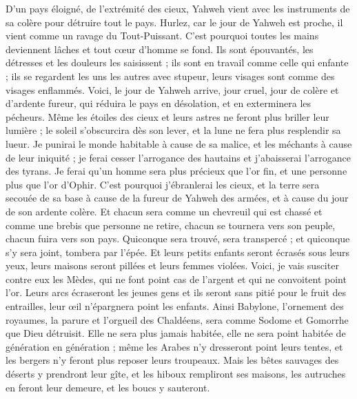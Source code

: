\begin{multicols}{2}
D'un pays éloigné, de l'extrémité des cieux, Yahweh vient avec les instruments de sa colère pour détruire tout le pays.
Hurlez, car le jour de Yahweh est proche, il vient comme un ravage du Tout-Puissant.
C'est pourquoi toutes les mains deviennent lâches et tout cœur d'homme se fond.
Ils sont épouvantés, les détresses et les douleurs les saisissent ; ils sont en travail comme celle qui enfante ; ils se regardent les uns les autres avec stupeur, leurs visages sont comme des visages enflammés.
Voici, le jour de Yahweh arrive, jour cruel, jour de colère et d'ardente fureur, qui réduira le pays en désolation, et en exterminera les pécheurs.
Même les étoiles des cieux et leurs astres ne feront plus briller leur lumière ; le soleil s'obscurcira dès son lever, et la lune ne fera plus resplendir sa lueur.
Je punirai le monde habitable à cause de sa malice, et les méchants à cause de leur iniquité ; je ferai cesser l'arrogance des hautains et j'abaisserai l'arrogance des tyrans.
Je ferai qu'un homme sera plus précieux que l'or fin, et une personne plus que l'or d'Ophir.
C'est pourquoi j'ébranlerai les cieux, et la terre sera secouée de sa base à cause de la fureur de Yahweh des armées, et à cause du jour de son ardente colère.
Et chacun sera comme un chevreuil qui est chassé et comme une brebis que personne ne retire, chacun se tournera vers son peuple, chacun fuira vers son pays.
Quiconque sera trouvé, sera transpercé ; et quiconque s'y sera joint, tombera par l'épée.
Et leurs petits enfants seront écrasés sous leurs yeux, leurs maisons seront pillées et leurs femmes violées.
Voici, je vais susciter contre eux les Mèdes, qui ne font point cas de l'argent et qui ne convoitent point l'or.
Leurs arcs écraseront les jeunes gens et ils seront sans pitié pour le fruit des entrailles, leur œil n'épargnera point les enfants.
Ainsi Babylone, l'ornement des royaumes, la parure et l'orgueil des Chaldéens, sera comme Sodome et Gomorrhe que Dieu détruisit.
Elle ne sera plus jamais habitée, elle ne sera point habitée de génération en génération ; même les Arabes n'y dresseront point leurs tentes, et les bergers n'y feront plus reposer leurs troupeaux.
Mais les bêtes sauvages des déserts y prendront leur gîte, et les hiboux rempliront ses maisons, les autruches en feront leur demeure, et les boucs y sauteront.

\end{multicols}
